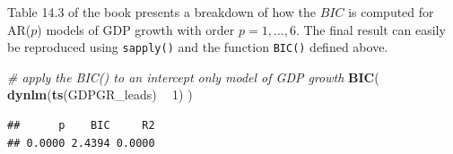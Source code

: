 \documentclass[]{book}
\newenvironment{Shaded}{\begin{snugshade}}{\end{snugshade}}
\newcommand{\KeywordTok}[1]{\textcolor[rgb]{0.13,0.29,0.53}{\textbf{#1}}}
\newcommand{\DecValTok}[1]{\textcolor[rgb]{0.00,0.00,0.81}{#1}}
\newcommand{\StringTok}[1]{\textcolor[rgb]{0.31,0.60,0.02}{#1}}
\newcommand{\CommentTok}[1]{\textcolor[rgb]{0.56,0.35,0.01}{\textit{#1}}}
\newcommand{\ControlFlowTok}[1]{\textcolor[rgb]{0.13,0.29,0.53}{\textbf{#1}}}
\newcommand{\OperatorTok}[1]{\textcolor[rgb]{0.81,0.36,0.00}{\textbf{#1}}}
\newcommand{\NormalTok}[1]{#1}
\theoremstyle{definition}
\theoremstyle{definition}
\theoremstyle{definition}
\theoremstyle{remark}
\begin{document}
\begin{Shaded}
\end{Shaded}

Table 14.3 of the book presents a breakdown of how the \(BIC\) is
computed for AR(\(p\)) models of GDP growth with order \(p=1,\dots,6\).
The final result can easily be reproduced using \texttt{sapply()} and
the function \texttt{BIC()} defined above.

\begin{Shaded}
\begin{Highlighting}[]
\CommentTok{# apply the BIC() to an intercept only model of GDP growth}
\KeywordTok{BIC}\NormalTok{(}
  \KeywordTok{dynlm}\NormalTok{(}\KeywordTok{ts}\NormalTok{(GDPGR_leads) }\OperatorTok{~}\StringTok{ }\DecValTok{1}\NormalTok{)}
\NormalTok{)}
\end{Highlighting}
\end{Shaded}

\begin{verbatim}
##      p    BIC     R2 
## 0.0000 2.4394 0.0000
\end{verbatim}
\end{document}
